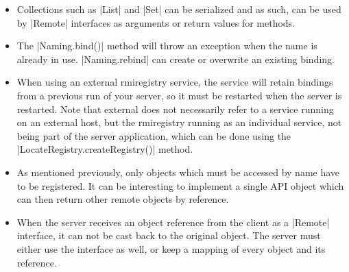 \documentclass[a4paper]{article}
\begin{document}
\begin{itemize}
\item Collections such as |List| and |Set| can be serialized and as such, can be used by |Remote| interfaces as arguments or return values for methods.
\item The |Naming.bind()| method will throw an exception when the name is already in use. |Naming.rebind| can create or overwrite an existing binding.
\item When using an external rmiregistry service, the service will retain bindings from a previous run of your server, so it must be restarted when the server is restarted. Note that external does not necessarily refer to a service running on an external host, but the rmiregistry running as an individual service, not being part of the server application, which can be done using the |LocateRegistry.createRegistry()| method.
\item As mentioned previously, only objects which must be accessed by name have to be registered. It can be interesting to implement a single API object which can then return other remote objects by reference.
\item When the server receives an object reference from the client as a |Remote| interface, it can not be cast back to the original object. The server must either use the interface as well, or keep a mapping of every object and its reference.
\end{itemize}
\end{document}
